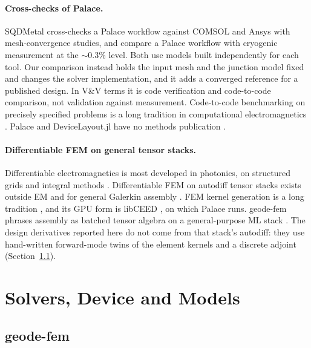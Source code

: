 \documentclass{anvil-paper}
\begin{document}
\paragraph{Cross-checks of Palace.}
SQDMetal \citep{sommers2025open} cross-checks a Palace workflow against
COMSOL and Ansys with mesh-convergence studies, and
\citet{ye2025electromagnetic} compare a Palace workflow with cryogenic
measurement at the ${\sim}0.3\%$ level. Both use models built
independently for each tool. Our comparison instead holds the input mesh
and the junction model fixed and changes the solver implementation, and it
adds a converged reference for a published design. In V\&V terms
\citep{roache1997quantification,oberkampf2010verification} it is code
verification and code-to-code comparison, not validation against
measurement. Code-to-code benchmarking on precisely specified problems is
a long tradition in computational electromagnetics
\citep{hoffmann2009comparison}. Palace and DeviceLayout.jl have no methods
publication \citep{palace,palace-blog,devicelayout,devicelayout-blog,devicelayout-juliacon}.

\paragraph{Differentiable FEM on general tensor stacks.}
Differentiable electromagnetics is most developed in photonics, on
structured grids and integral methods
\citep{molesky2018inverse,hughes2019forward,hammond2022high,schubert2022inverse,mahlau2026fdtdx,ponomareva2025torchgdm,kim2024meent}.
Differentiable FEM on autodiff tensor stacks exists outside EM
\citep{xue2023jax,liang2023pytorch} and for general Galerkin assembly
\citep{wen2026learning,chi2026torch}. FEM kernel generation is a long
tradition \citep{kirby2006compiler,alnaes2014unified,rathgeber2017firedrake,homolya2018tsfc},
and its GPU form is libCEED \citep{brown2021libceed}, on which Palace
runs. geode-fem phrases assembly as batched tensor algebra on a
general-purpose ML stack \citep{ragankelley2013halide,chen2018tvm}. The
design derivatives reported here do not come from that stack's autodiff:
they use hand-written forward-mode twins of the element kernels and a
discrete adjoint (Section~\ref{sec:architecture}).

\section{Solvers, Device and Models}
\label{sec:setup}

\subsection{geode-fem}
\label{sec:architecture}
\end{document}
